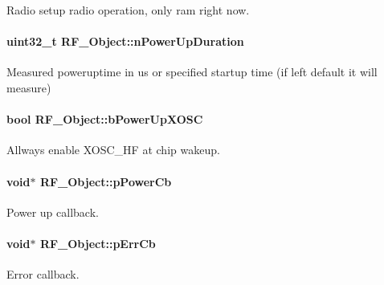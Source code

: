 Radio setup radio operation, only ram right now. 

\paragraph[{n\+Power\+Up\+Duration}]{\setlength{\rightskip}{0pt plus 5cm}uint32\+\_\+t R\+F\+\_\+\+Object\+::n\+Power\+Up\+Duration}\label{struct_r_f___object_a1c977babafc1c400ee7065d588400d62}


Measured poweruptime in us or specified startup time (if left default it will measure) 

\paragraph[{b\+Power\+Up\+X\+O\+S\+C}]{\setlength{\rightskip}{0pt plus 5cm}bool R\+F\+\_\+\+Object\+::b\+Power\+Up\+X\+O\+S\+C}\label{struct_r_f___object_a2639ebccaae9e421775673e83d477d93}


Allways enable X\+O\+S\+C\+\_\+\+H\+F at chip wakeup. 

\paragraph[{p\+Power\+Cb}]{\setlength{\rightskip}{0pt plus 5cm}void$\ast$ R\+F\+\_\+\+Object\+::p\+Power\+Cb}\label{struct_r_f___object_ab93839cd7dc102b3eb1c79a3dceb194d}


Power up callback. 

\paragraph[{p\+Err\+Cb}]{\setlength{\rightskip}{0pt plus 5cm}void$\ast$ R\+F\+\_\+\+Object\+::p\+Err\+Cb}\label{struct_r_f___object_adf7c2500d579f201e49a6c87e447991b}


Error callback. 


